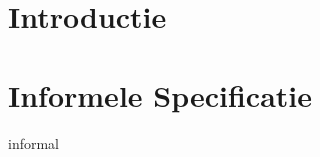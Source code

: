 \documentclass[a4paper,11pt]{article}
\begin{document}
	
	
	\tableofcontents
	\newpage

	\section{Introductie}
	
	\newpage

	\section{Informele Specificatie}
	 {informal}
	\newpage
\end{document}
